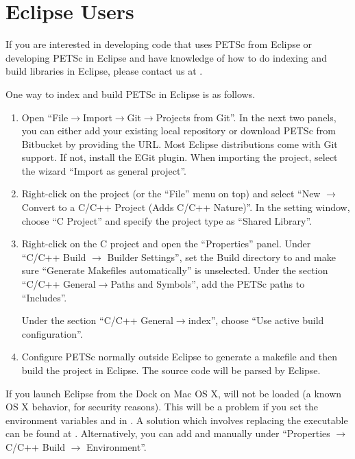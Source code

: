 {{\section{Eclipse Users} 
If you are interested in developing code that uses PETSc from Eclipse or developing PETSc in Eclipse and have knowledge of how to do indexing and build libraries in Eclipse, please contact us at \href{mailto:petsc-dev@mcs.anl.gov}{}.

One way to index and build PETSc in Eclipse is as follows.
\begin{enumerate}
  \item Open ``File$\rightarrow$Import$\rightarrow$Git$\rightarrow$Projects from Git''.
  In the next two panels, you can either add your existing local repository or download PETSc from Bitbucket by providing the URL.
  Most Eclipse distributions come with Git support. If not, install the EGit plugin. When importing the project, select the wizard ``Import as general project''.
  \item Right-click on the project (or the ``File'' menu on top) and select ``New $\rightarrow$ Convert to a C/C++ Project (Adds C/C++ Nature)''.
  In the setting window, choose ``C Project'' and specify the project type as ``Shared Library''.
  \item Right-click on the C project and open the ``Properties'' panel. Under ``C/C++ Build $\rightarrow$ Builder Settings'',
  set the Build directory to  and make sure ``Generate Makefiles automatically'' is unselected.
  Under the section ``C/C++ General$\rightarrow$Paths and Symbols'', add the PETSc paths to ``Includes''.
  Under the section ``C/C++ General$\rightarrow$index'', choose ``Use active build configuration''.
  \item Configure PETSc normally outside Eclipse to generate a makefile and then build the project in Eclipse. The source code will be parsed by Eclipse.
\end{enumerate}

If you launch Eclipse from the Dock on Mac OS X,  will not be loaded (a known OS X behavior, for security reasons).
This will be a problem if you set the environment variables  and  in .
A solution which involves replacing the executable can be found at
\href{http://stackoverflow.com/questions/829749}
{}.
Alternatively, you can add  and  manually under ``Properties $\rightarrow$ C/C++ Build $\rightarrow$ Environment''.

}}
